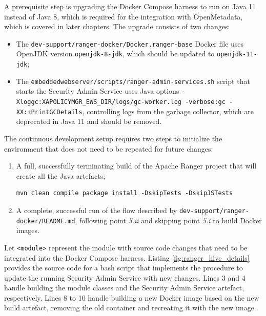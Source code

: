 A prerequisite step is upgrading the Docker Compose harness to run on Java 11 instead of Java 8, which is required for the integration with OpenMetadata, which is covered in later chapters. The upgrade consists of two changes:

\begin{itemize}
    \item The \texttt{dev-support/ranger-docker/Docker.ranger-base} Docker file uses OpenJDK version \texttt{openjdk-8-jdk}, which should be updated to \texttt{openjdk-11-jdk};
    \item The \texttt{embeddedwebserver/scripts/ranger-admin-services.sh} script that starts the Security Admin Service uses Java options \texttt{-Xloggc:{XAPOLICYMGR_EWS_DIR}/logs/gc-worker.log -verbose:gc -XX:+PrintGCDetails}, controlling logs from the garbage collector, which are deprecated in Java 11 and should be removed.
\end{itemize}

The continuous development setup requires two steps to initialize the environment that does not need to be repeated for future changes:

\begin{enumerate}

\item A full, successfully terminating build of the Apache Ranger project that will create all the Java artefacts;
\begin{verbatim}
mvn clean compile package install -DskipTests -DskipJSTests
\end{verbatim}

\item A complete, successful run of the flow described by \texttt{dev-support/ranger-docker/README.md}, following point \textit{5.ii} and skipping point \textit{5.i} to build Docker images.

\end{enumerate}

Let \texttt{<module>} represent the module with source code changes that need to be integrated into the Docker Compose harness. Listing \ref{fig:ranger_hive_details} provides the source code for a bash script that implements the procedure to update the running Security Admin Service with new changes. Lines 3 and 4 handle building the module classes and the Security Admin Service artefact, respectively. Lines 8 to 10 handle building a new Docker image based on the new build artefact, removing the old container and recreating it with the new image. 

